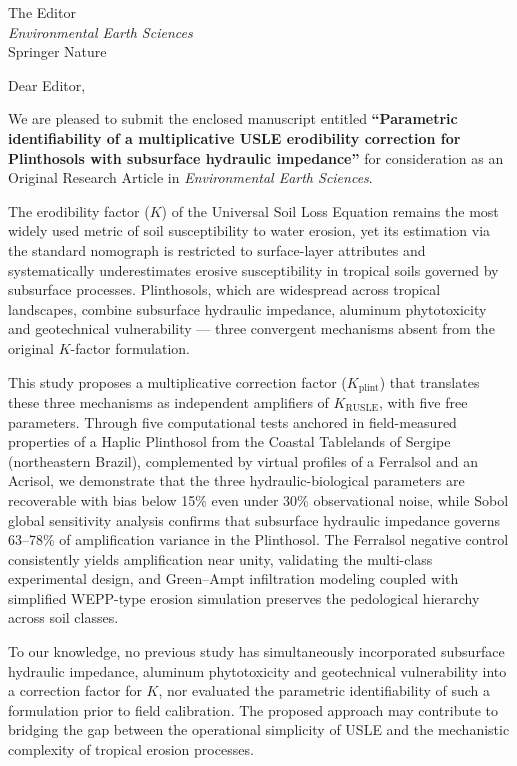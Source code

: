 \documentclass[11pt,a4paper]{letter}
\date{\today}
\begin{document}
\begin{letter}{The Editor\\
\textit{Environmental Earth Sciences}\\
Springer Nature}

\opening{Dear Editor,}

We are pleased to submit the enclosed manuscript entitled \textbf{``Parametric identifiability of a multiplicative USLE erodibility correction for Plinthosols with subsurface hydraulic impedance''} for consideration as an Original Research Article in \textit{Environmental Earth Sciences}.

The erodibility factor ($K$) of the Universal Soil Loss Equation remains the most widely used metric of soil susceptibility to water erosion, yet its estimation via the standard nomograph is restricted to surface-layer attributes and systematically underestimates erosive susceptibility in tropical soils governed by subsurface processes. Plinthosols, which are widespread across tropical landscapes, combine subsurface hydraulic impedance, aluminum phytotoxicity and geotechnical vulnerability --- three convergent mechanisms absent from the original $K$-factor formulation.

This study proposes a multiplicative correction factor ($K_{\mathrm{plint}}$) that translates these three mechanisms as independent amplifiers of $K_{\mathrm{RUSLE}}$, with five free parameters. Through five computational tests anchored in field-measured properties of a Haplic Plinthosol from the Coastal Tablelands of Sergipe (northeastern Brazil), complemented by virtual profiles of a Ferralsol and an Acrisol, we demonstrate that the three hydraulic-biological parameters are recoverable with bias below 15\% even under 30\% observational noise, while Sobol global sensitivity analysis confirms that subsurface hydraulic impedance governs 63--78\% of amplification variance in the Plinthosol. The Ferralsol negative control consistently yields amplification near unity, validating the multi-class experimental design, and Green--Ampt infiltration modeling coupled with simplified WEPP-type erosion simulation preserves the pedological hierarchy across soil classes.

To our knowledge, no previous study has simultaneously incorporated subsurface hydraulic impedance, aluminum phytotoxicity and geotechnical vulnerability into a correction factor for $K$, nor evaluated the parametric identifiability of such a formulation prior to field calibration. The proposed approach may contribute to bridging the gap between the operational simplicity of USLE and the mechanistic complexity of tropical erosion processes.


\end{letter}
\end{document}

